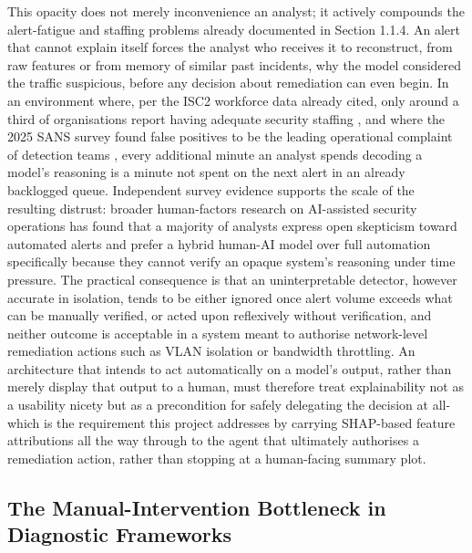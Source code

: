 This opacity does not merely inconvenience an analyst; it actively compounds the alert-fatigue and staffing problems already documented in Section 1.1.4. An alert that cannot explain itself forces the analyst who receives it to reconstruct, from raw features or from memory of similar past incidents, why the model considered the traffic suspicious, before any decision about remediation can even begin. In an environment where, per the ISC2 workforce data already cited, only around a third of organisations report having adequate security staffing \cite{ISC22025}, and where the 2025 SANS survey found false positives to be the leading operational complaint of detection teams \cite{SANS2025}, every additional minute an analyst spends decoding a model's reasoning is a minute not spent on the next alert in an already backlogged queue. Independent survey evidence supports the scale of the resulting distrust: broader human-factors research on AI-assisted security operations has found that a majority of analysts express open skepticism toward automated alerts and prefer a hybrid human-AI model over full automation specifically because they cannot verify an opaque system's reasoning under time pressure. The practical consequence is that an uninterpretable detector, however accurate in isolation, tends to be either ignored once alert volume exceeds what can be manually verified, or acted upon reflexively without verification, and neither outcome is acceptable in a system meant to authorise network-level remediation actions such as VLAN isolation or bandwidth throttling. An architecture that intends to act automatically on a model's output, rather than merely display that output to a human, must therefore treat explainability not as a usability nicety but as a precondition for safely delegating the decision at all-which is the requirement this project addresses by carrying SHAP-based feature attributions all the way through to the agent that ultimately authorises a remediation action, rather than stopping at a human-facing summary plot.

\subsection{The Manual-Intervention Bottleneck in Diagnostic Frameworks}

